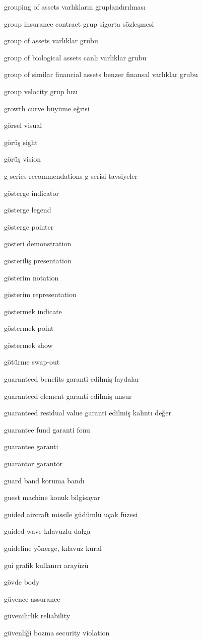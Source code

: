 \documentclass[12pt,fleqn]{article}\usepackage{../../common}
\begin{document}
grouping of assets varlıkların gruplandırılması

group insurance contract grup sigorta sözleşmesi

group of assets varlıklar grubu

group of biological assets canlı varlıklar grubu

group of similar financial assets benzer finansal varlıklar grubu

group velocity grup hızı

growth curve büyüme eğrisi

görsel visual

görüş sight

görüş vision

g-series recommendations g-serisi tavsiyeler

gösterge indicator

gösterge legend

gösterge pointer

gösteri demonstration

gösteriliş presentation

gösterim notation

gösterim representation

göstermek indicate

göstermek point

göstermek show

götürme swap-out

guaranteed benefits garanti edilmiş faydalar

guaranteed element garanti edilmiş unsur

guaranteed residual value garanti edilmiş kalıntı değer

guarantee fund garanti fonu

guarantee garanti

guarantor garantör

guard band koruma bandı

guest machine konuk bilgisayar

guided aircraft missile güdümlü uçak füzesi

guided wave kılavuzlu dalga

guideline yönerge, kılavuz kural

gui grafik kullanıcı arayüzü

gövde body

güvence assurance

güvenilirlik reliability

güvenliği bozma security violation
\end{document}
